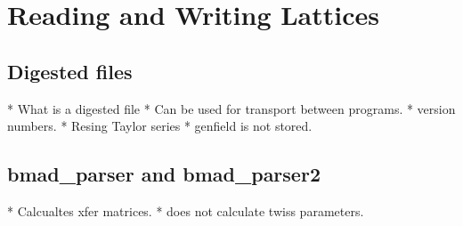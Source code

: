 \chapter{Reading and Writing Lattices}

\section{Digested files}

  * What is a digested file
  * Can be used for transport between programs.
  * version numbers.
  * Resing Taylor series
  * genfield is not stored.

\section{bmad\_parser and bmad\_parser2}
  * Calcualtes xfer matrices.
  * does not calculate twiss parameters.

